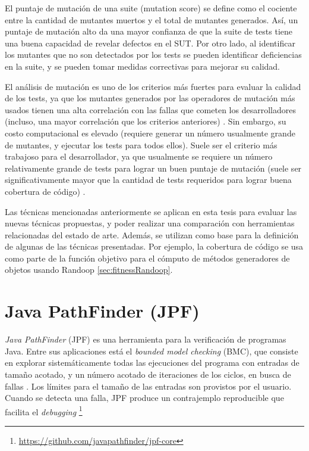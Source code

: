 El puntaje de mutación de una suite (mutation score) se define como
el cociente entre la cantidad de mutantes muertos y el total de mutantes
generados. Así, un puntaje de mutación alto da una mayor confianza de que la suite 
de tests tiene una buena capacidad de revelar defectos en el SUT. 
Por otro lado, al identificar los mutantes que no son detectados por los tests 
se pueden identificar deficiencias en la suite, y se pueden tomar medidas 
correctivas para mejorar su calidad.

El análisis de mutación es uno de los criterios más fuertes para evaluar la 
calidad de los tests, ya que los mutantes generados por las operadores de 
mutación más usados 
tienen una alta correlación con las fallas que cometen los desarrolladores 
(incluso, una mayor correlación que los criterios anteriores) \cite{just2014mutants}. Sin
embargo, su costo computacional es elevado (requiere generar un
número usualmente grande de mutantes, y ejecutar los tests para todos ellos). 
Suele ser el criterio más trabajoso para el desarrollador, ya que usualmente 
se requiere un número relativamente grande de tests para lograr un buen puntaje 
de mutación (suele ser significativamente mayor que la cantidad de tests
    requeridos para lograr buena cobertura de código) \cite{papadakis2019}.

Las técnicas mencionadas anteriormente se aplican en esta tesis para evaluar las 
nuevas técnicas propuestas, y poder realizar una comparación con herramientas
relacionadas del estado de arte. Además, se utilizan como base para la
definición de algunas de las técnicas presentadas. Por ejemplo, la cobertura de
código se usa como parte de la función objetivo para el cómputo de métodos
generadores de objetos usando Randoop \ref{sec:fitnessRandoop}.


\section{Java PathFinder (JPF)}
\label{sec:jpf}

\emph{Java PathFinder} (JPF) es una herramienta para la verificación de
programas Java. Entre sus aplicaciones está el \emph{bounded model checking} (BMC), que
consiste en explorar sistemáticamente todas las ejecuciones del programa con
entradas de tamaño acotado, y un número acotado de iteraciones de los ciclos, en busca de fallas
\cite{Visser05,Pasareanu:2010}. Los límites para el tamaño de las entradas
son provistos por el usuario. 
Cuando se detecta una falla, JPF produce un contrajemplo reproducible que facilita el
\emph{debugging}  \footnote{\url{https://github.com/javapathfinder/jpf-core}}

